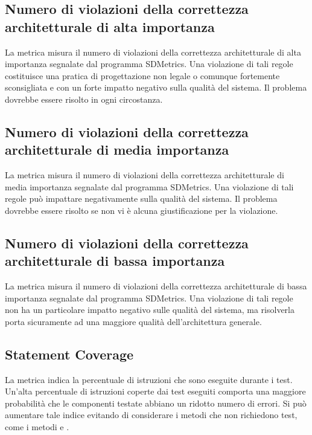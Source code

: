 \subsection{Numero di violazioni della correttezza architetturale di alta importanza}
La metrica misura il numero di violazioni della correttezza architetturale di alta importanza segnalate dal programma SDMetrics. Una violazione di tali regole costituisce una pratica di progettazione non legale o comunque fortemente sconsigliata e con un forte impatto negativo sulla qualità del sistema. Il problema dovrebbe essere risolto in ogni circostanza.



\subsection{Numero di violazioni della correttezza architetturale di media importanza}
La metrica misura il numero di violazioni della correttezza architetturale di media importanza segnalate dal programma SDMetrics. Una violazione di tali regole può impattare negativamente sulla qualità del sistema. Il problema dovrebbe essere risolto se non vi è alcuna giustificazione per la violazione.



\subsection{Numero di violazioni della correttezza architetturale di bassa importanza}
La metrica misura il numero di violazioni della correttezza architetturale di bassa importanza segnalate dal programma SDMetrics. Una violazione di tali regole non ha un particolare impatto negativo sulle qualità del sistema, ma risolverla porta sicuramente ad una maggiore qualità dell'architettura generale.



\subsection{Statement Coverage}
La metrica indica la percentuale di istruzioni che sono eseguite durante i test. Un'alta percentuale di istruzioni coperte dai test eseguiti comporta una maggiore probabilità che le componenti testate abbiano un ridotto numero di errori. Si può aumentare tale indice evitando di considerare i metodi che non richiedono test, come i metodi  e .



